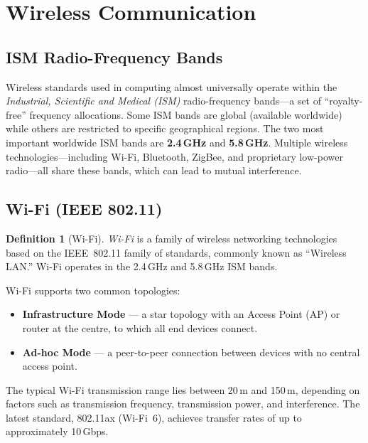 \documentclass[11pt, a4paper, notitlepage]{report}
\theoremstyle{definition}
\newtheorem{definition}[theorem]{Definition}
\theoremstyle{remark}
\theoremstyle{definition}
\begin{document}
\section{Wireless Communication}
\label{sec:wireless-comm}

\subsection{ISM Radio-Frequency Bands}
\label{sec:ism-band}

Wireless standards used in computing almost universally operate within the \emph{Industrial, Scientific and Medical (ISM)} radio-frequency bands---a set of ``royalty-free'' frequency allocations. Some ISM bands are global (available worldwide) while others are restricted to specific geographical regions. The two most important worldwide ISM bands are \textbf{2.4\,GHz} and \textbf{5.8\,GHz}. Multiple wireless technologies---including Wi-Fi, Bluetooth, ZigBee, and proprietary low-power radio---all share these bands, which can lead to mutual interference.

\subsection{Wi-Fi (IEEE 802.11)}
\label{sec:wifi}

\begin{definition}[Wi-Fi]
  \label{def:wifi}
  \emph{Wi-Fi} is a family of wireless networking technologies based on the IEEE~802.11 family of standards, commonly known as ``Wireless LAN.'' Wi-Fi operates in the 2.4\,GHz and 5.8\,GHz ISM bands.
\end{definition}

Wi-Fi supports two common topologies:

\begin{itemize}
  \item \textbf{Infrastructure Mode} --- a star topology with an Access Point (AP) or router at the centre, to which all end devices connect.
  \item \textbf{Ad-hoc Mode} --- a peer-to-peer connection between devices with no central access point.
\end{itemize}

The typical Wi-Fi transmission range lies between 20\,m and 150\,m, depending on factors such as transmission frequency, transmission power, and interference. The latest standard, 802.11ax (Wi-Fi~6), achieves transfer rates of up to approximately 10\,Gbps.
\end{document}
